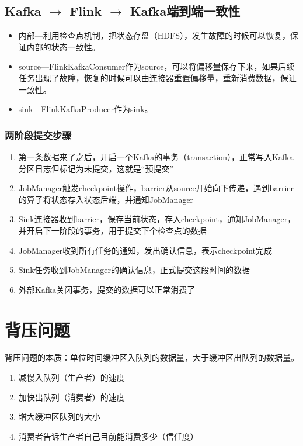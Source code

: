 \documentclass[cn,11pt,chinese]{elegantbook}
\begin{document}
\section{Kafka $\rightarrow$ Flink $\rightarrow$ Kafka端到端一致性}

\begin{itemize}
  \item 内部—利用检查点机制，把状态存盘（HDFS），发生故障的时候可以恢复，保证内部的状态一致性。
  \item source—FlinkKafkaConsumer作为source，可以将偏移量保存下来，如果后续任务出现了故障，恢复的时候可以由连接器重置偏移量，重新消费数据，保证一致性。
  \item sink—FlinkKafkaProducer作为sink。
\end{itemize}

\subsection{两阶段提交步骤}

\begin{enumerate}
  \item 第一条数据来了之后，开启一个Kafka的事务（transaction），正常写入Kafka分区日志但标记为未提交，这就是“预提交”
  \item JobManager触发checkpoint操作，barrier从source开始向下传递，遇到barrier的算子将状态存入状态后端，并通知JobManager
  \item Sink连接器收到barrier，保存当前状态，存入checkpoint，通知JobManager，并开启下一阶段的事务，用于提交下个检查点的数据
  \item JobManager收到所有任务的通知，发出确认信息，表示checkpoint完成
  \item Sink任务收到JobManager的确认信息，正式提交这段时间的数据
  \item 外部Kafka关闭事务，提交的数据可以正常消费了
\end{enumerate}

\chapter{背压问题}

背压问题的本质：单位时间缓冲区入队列的数据量，大于缓冲区出队列的数据量。

\begin{enumerate}
  \item 减慢入队列（生产者）的速度
  \item 加快出队列（消费者）的速度
  \item 增大缓冲区队列的大小
  \item 消费者告诉生产者自己目前能消费多少（信任度）
\end{enumerate}
\end{document}

